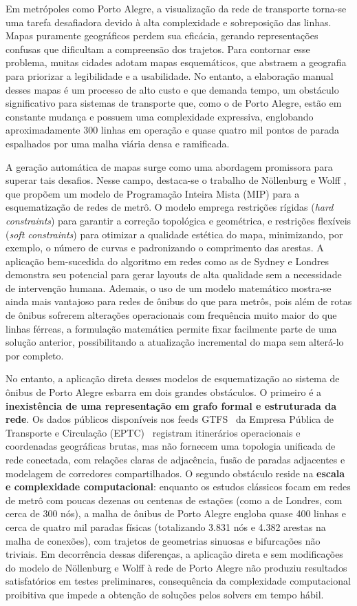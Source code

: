 \documentclass[cic,tc]{infufrgs}
\begin{document}
Em metrópoles como Porto Alegre, a visualização da rede de transporte torna-se uma tarefa desafiadora devido à alta complexidade e sobreposição das linhas. Mapas puramente geográficos perdem sua eficácia, gerando representações confusas que dificultam a compreensão dos trajetos. Para contornar esse problema, muitas cidades adotam mapas esquemáticos, que abstraem a geografia para priorizar a legibilidade e a usabilidade. No entanto, a elaboração manual desses mapas é um processo de alto custo e que demanda tempo, um obstáculo significativo para sistemas de transporte que, como o de Porto Alegre, estão em constante mudança e possuem uma complexidade expressiva, englobando aproximadamente 300 linhas em operação e quase quatro mil pontos de parada espalhados por uma malha viária densa e ramificada.

A geração automática de mapas surge como uma abordagem promissora para superar tais desafios. Nesse campo, destaca-se o trabalho de Nöllenburg e Wolff \cite{Nollenburg}, que propõem um modelo de Programação Inteira Mista (MIP) para a esquematização de redes de metrô. O modelo emprega restrições rígidas (\textit{hard constraints}) para garantir a correção topológica e geométrica, e restrições flexíveis (\textit{soft constraints}) para otimizar a qualidade estética do mapa, minimizando, por exemplo, o número de curvas e padronizando o comprimento das arestas. A aplicação bem-sucedida do algoritmo em redes como as de Sydney e Londres demonstra seu potencial para gerar layouts de alta qualidade sem a necessidade de intervenção humana. Ademais, o uso de um modelo matemático mostra-se ainda mais vantajoso para redes de ônibus do que para metrôs, pois além de rotas de ônibus sofrerem alterações operacionais com frequência muito maior do que linhas férreas, a formulação matemática permite fixar facilmente parte de uma solução anterior, possibilitando a atualização incremental do mapa sem alterá-lo por completo.

No entanto, a aplicação direta desses modelos de esquematização ao sistema de ônibus de Porto Alegre esbarra em dois grandes obstáculos. O primeiro é a \textbf{inexistência de uma representação em grafo formal e estruturada da rede}. Os dados públicos disponíveis nos feeds GTFS~\cite{gtfs_spec} da Empresa Pública de Transporte e Circulação (EPTC)~\cite{EPTCGTFS} registram itinerários operacionais e coordenadas geográficas brutas, mas não fornecem uma topologia unificada de rede conectada, com relações claras de adjacência, fusão de paradas adjacentes e modelagem de corredores compartilhados. O segundo obstáculo reside na \textbf{escala e complexidade computacional}: enquanto os estudos clássicos focam em redes de metrô com poucas dezenas ou centenas de estações (como a de Londres, com cerca de 300 nós), a malha de ônibus de Porto Alegre engloba quase 400 linhas e cerca de quatro mil paradas físicas (totalizando 3.831 nós e 4.382 arestas na malha de conexões), com trajetos de geometrias sinuosas e bifurcações não triviais. Em decorrência dessas diferenças, a aplicação direta e sem modificações do modelo de Nöllenburg e Wolff à rede de Porto Alegre não produziu resultados satisfatórios em testes preliminares, consequência da complexidade computacional proibitiva que impede a obtenção de soluções pelos solvers em tempo hábil.
\end{document}

